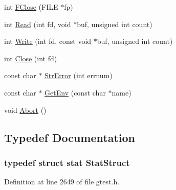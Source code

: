 \begin{DoxyCompactItemize}
\item 
int \hyperlink{namespacetesting_1_1internal_1_1posix_a69185e213a0e903723d28fe4db39e5ae}{\-F\-Close} (\-F\-I\-L\-E $\ast$fp)
\item 
int \hyperlink{namespacetesting_1_1internal_1_1posix_a6c02983bd73d8083cd46e47b7cd114f1}{\-Read} (int fd, void $\ast$buf, unsigned int count)
\item 
int \hyperlink{namespacetesting_1_1internal_1_1posix_a9bb8588c4b70daa75e2507d8c845e224}{\-Write} (int fd, const void $\ast$buf, unsigned int count)
\item 
int \hyperlink{namespacetesting_1_1internal_1_1posix_a6f8ed9be61fa28cc4bcf197d99d3e898}{\-Close} (int fd)
\item 
const char $\ast$ \hyperlink{namespacetesting_1_1internal_1_1posix_a63c0c6ba1a8123ba43417a7199250f15}{\-Str\-Error} (int errnum)
\item 
const char $\ast$ \hyperlink{namespacetesting_1_1internal_1_1posix_a7ed11bcd211f76641b16e60b5f0594eb}{\-Get\-Env} (const char $\ast$name)
\item 
void \hyperlink{namespacetesting_1_1internal_1_1posix_a12b9283f52eaf7610afe4b04fbca2ff0}{\-Abort} ()
\end{DoxyCompactItemize}


\subsection{\-Typedef \-Documentation}
\hypertarget{namespacetesting_1_1internal_1_1posix_a28f577553e4511ddefedf8c62dda12cd}{
\subsubsection[{\-Stat\-Struct}]{\setlength{\rightskip}{0pt plus 5cm}typedef struct stat {\bf \-Stat\-Struct}}}\label{d0/d81/namespacetesting_1_1internal_1_1posix_a28f577553e4511ddefedf8c62dda12cd}


\-Definition at line 2649 of file gtest.\-h.



